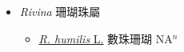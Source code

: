 
  \begin{itemize}
 \item[] \textit{Rivina} 珊瑚珠屬
                    
  \begin{itemize}
        \item[] \href{http://www.theplantlist.org/tpl1.1/search?q=Rivina+humilis}{\textit{R. humilis} L.}   數珠珊瑚 NA$^n$
  \end{itemize}
  \end{itemize}
